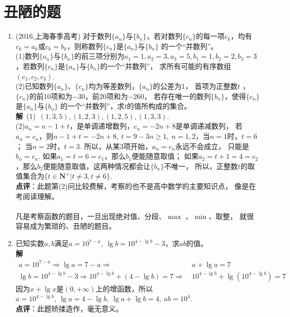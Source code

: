 \section{丑陋的题}
\begin{enumerate}[label={【\textbf{例\thechapter.\arabic*}】},
 leftmargin=\inteval{\myenumleftmargin}pt,
 itemsep=\inteval{\myenumitempsep}pt,
 itemindent=\inteval{\myenumitemindent}pt]
\item (2016,上海春季高考)
对于数列$ \{a_n\} $与$ \{b_n\} $，若对数列$ \{c_n\} $的每一项$ c_k $，均有
$ c_k=a_k $或$ c_k=b_k $，则称数列$ \{c_n\} $是$ \{a_n\} $与$ \{b_n\} $
的一个“并数列”。\\
(1)数列$ \{a_n\} $与$ \{b_n\} $的前三项分别为$ a_1=1,a_2=3,a_3=5,b_1=1,b_2=2,
b_3=3 $，若数列$ \{c_n\} $是$ \{a_n\} $与$ \{b_n\} $的一个“并数列”，
求所有可能的有序数组$ (c_1,c_2,c_3) $. \\
(2)已知数列$ \{a_n\} $、$ \{c_n\} $均为等差数列，$ \{a_n\} $的公差为1，
首项为正整数$ t $ ，$ \{c_n\} $的前10项和为$ -30 $，前20项和为$ -260 $，
若存在唯一的数列$ \{b_n\} $，使得$ \{c_n\} $是$ \{a_n\} $与$ \{b_n\} $
的一个“并数列”，求$ t $的值所构成的集合。\\
\textbf{解}\ (1)\ $ (1,3,5),(1,2,3),(1,2,5),(1,3,3) $. \\
(2)$ a_n=n-1+t $，是单调递增数列，$ c_n=-2n+8 $是单调递减数列，
若$ a_n=c_n $，则$ n-1+t=-2n+8,\ t=9-3n\geq 1,\ n=1,2 $，当$ n=1 $时，$ t=6 $；
当$ n=2 $时，$ t=3 $. 所以，从某3项开始，$ a_n=c_n $永远不会成立，
只能是$ b_n=c_n $. 如果$ a_1=t=6=c_1 $，那么$ b_1 $便能随意取值；
如果$ a_2=t+1=4=c_2 $，那么$ b_2 $便能随意取值，这两种情况都会让$ \{b_n\} $不唯一，
所以，正整数$ t $的取值集合为$ \{t\in \textbf{N}^+|t\neq 3,t\neq 6\} $. \\
\textbf{点评}：此题第(2)问比较费解，考察的也不是高中数学的主要知识点，
像是在考阅读理解。\\
\\
凡是考察函数的题目，一旦出现绝对值、分段、$ \max $ 、$ \min $、取整，
就很容易成为繁琐的、丑陋的题目。

\item 已知实数$ a,b $满足$ a=10^{7-a},\ \lg b=10^{4-\lg b}-3 $，求$ ab $的值。\\
\textbf{解}\ 
\begin{align*}
    a=10^{7-a} \Rightarrow \lg a=7-a \Rightarrow &\  a+\lg a=7 \\
    \lg b=10^{4-\lg b}-3 \Rightarrow 10^{4-\lg b}+(4-\lg b)=7 \Rightarrow & \ 
    10^{4-\lg b}+\lg (10^{4-\lg b})=7 
\end{align*}
因为$ x+\lg x $是$ (0,+\infty) $上的增函数，所以$ a=10^{4-\lg b},\ \lg a=4-\lg b,\ 
\lg a+\lg b=4,\ ab=10^4 $. \\
\textbf{点评}：此题矫揉造作，毫无意义。


\end{enumerate}

